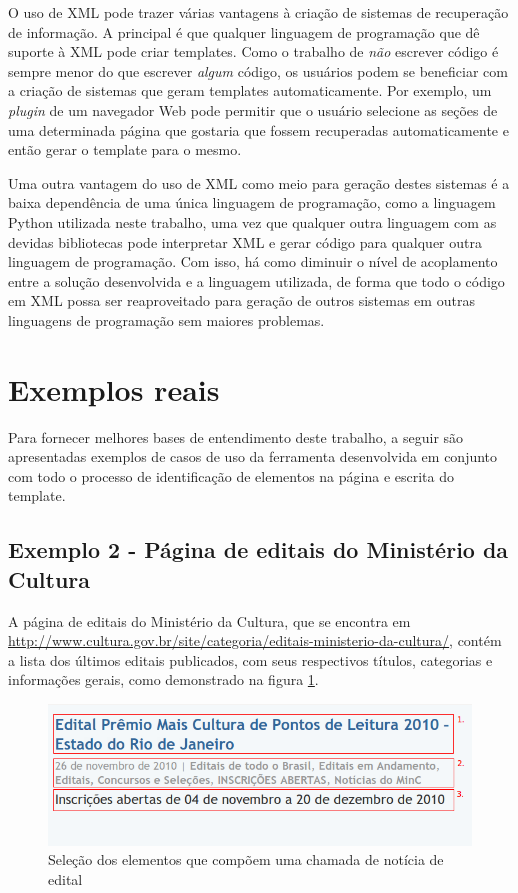 O uso de XML pode trazer várias vantagens à criação de sistemas de recuperação de informação. A principal é que qualquer linguagem de programação que dê suporte à XML pode criar templates. Como o trabalho de \emph{não} escrever código é sempre menor do que escrever \emph{algum} código, os usuários podem se beneficiar com a criação de sistemas que geram templates automaticamente. Por exemplo, um \emph{plugin} de um navegador Web pode permitir que o usuário selecione as seções de uma determinada página que gostaria que fossem recuperadas automaticamente e então gerar o template para o mesmo. 

Uma outra vantagem do uso de XML como meio para geração destes sistemas é a baixa dependência de uma única linguagem de programação, como a linguagem Python utilizada neste trabalho, uma vez que qualquer outra linguagem com as devidas bibliotecas pode interpretar XML e gerar código para qualquer outra linguagem de programação. Com isso, há como diminuir o nível de acoplamento entre a solução desenvolvida e a linguagem utilizada, de forma que todo o código em XML possa ser reaproveitado para geração de outros sistemas em outras linguagens de programação sem maiores problemas.

\pagebreak
\section{Exemplos reais}

Para fornecer melhores bases de entendimento deste trabalho, a seguir são apresentadas exemplos de casos de uso da ferramenta desenvolvida em conjunto com todo o processo de identificação de elementos na página e escrita do template.

\subsection{Exemplo 2 - Página de editais do Ministério da Cultura}

A página de editais do Ministério da Cultura, que se encontra em \url{http://www.cultura.gov.br/site/categoria/editais-ministerio-da-cultura/}, contém a lista dos últimos editais publicados, com seus respectivos títulos, categorias e informações gerais, como demonstrado na figura \ref{minc}.

\begin{figure} [ht]
	\centering
	\includegraphics[scale=0.8]{minc.png}
	\caption{Seleção dos elementos que compõem uma chamada de notícia de edital}
	\label{minc}
\end{figure}

